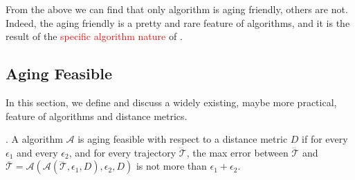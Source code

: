 From the above we can find that only algorithm \dpa is aging friendly, others are not. Indeed, the {aging friendly} is a pretty and rare feature of \lsa algorithms, and it is the result of the \textcolor{red}{specific algorithm nature} of \dpa.



\subsection{Aging Feasible}
In this section, we define and discuss a widely existing, maybe more practical, feature of \lsa algorithms and distance metrics.

. {A \lsa algorithm $\mathcal{A}$ is aging feasible with respect to a distance metric $D$ if for every $\epsilon_1$ and every $\epsilon_2$, and for every trajectory $\dddot{\mathcal{T}}$, the max error between $\dddot{\mathcal{T}}$ and $\overline{\mathcal{T}}=\mathcal{A}(\mathcal{A}(\dddot{\mathcal{T}}, \epsilon_1, D), \epsilon_2, D)$ is not more than $\epsilon_1+ \epsilon_2$.}


